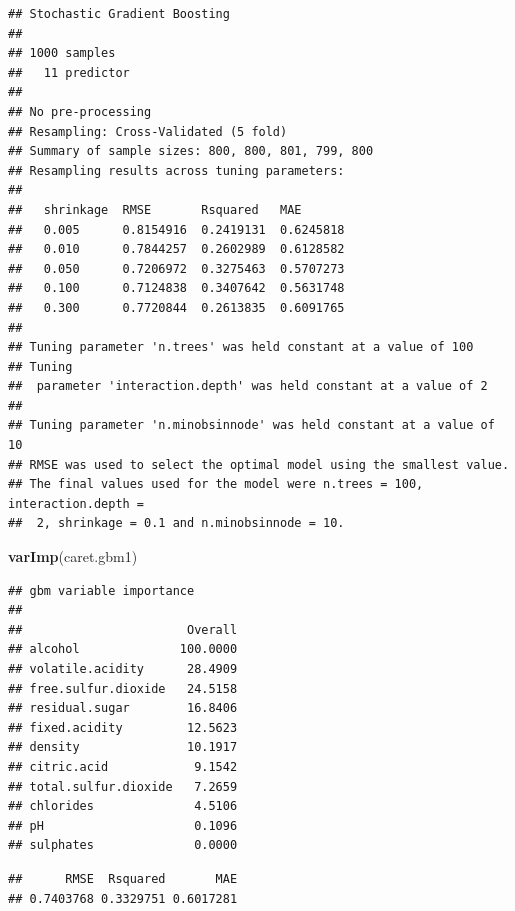 \documentclass[
  spanish,
]{book}
\newenvironment{Shaded}{\begin{snugshade}}{\end{snugshade}}
\newcommand{\DataTypeTok}[1]{\textcolor[rgb]{0.13,0.29,0.53}{#1}}
\newcommand{\KeywordTok}[1]{\textcolor[rgb]{0.13,0.29,0.53}{\textbf{#1}}}
\newcommand{\NormalTok}[1]{#1}
\newcommand{\OperatorTok}[1]{\textcolor[rgb]{0.81,0.36,0.00}{\textbf{#1}}}
\theoremstyle{break}
\theoremstyle{definition}
\theoremstyle{definition}
\theoremstyle{definition}
\theoremstyle{remark}
\begin{document}
\begin{verbatim}
## Stochastic Gradient Boosting 
## 
## 1000 samples
##   11 predictor
## 
## No pre-processing
## Resampling: Cross-Validated (5 fold) 
## Summary of sample sizes: 800, 800, 801, 799, 800 
## Resampling results across tuning parameters:
## 
##   shrinkage  RMSE       Rsquared   MAE      
##   0.005      0.8154916  0.2419131  0.6245818
##   0.010      0.7844257  0.2602989  0.6128582
##   0.050      0.7206972  0.3275463  0.5707273
##   0.100      0.7124838  0.3407642  0.5631748
##   0.300      0.7720844  0.2613835  0.6091765
## 
## Tuning parameter 'n.trees' was held constant at a value of 100
## Tuning
##  parameter 'interaction.depth' was held constant at a value of 2
## 
## Tuning parameter 'n.minobsinnode' was held constant at a value of 10
## RMSE was used to select the optimal model using the smallest value.
## The final values used for the model were n.trees = 100, interaction.depth =
##  2, shrinkage = 0.1 and n.minobsinnode = 10.
\end{verbatim}

\begin{Shaded}
\begin{Highlighting}[]
\KeywordTok{varImp}\NormalTok{(caret.gbm1)}
\end{Highlighting}
\end{Shaded}

\begin{verbatim}
## gbm variable importance
## 
##                       Overall
## alcohol              100.0000
## volatile.acidity      28.4909
## free.sulfur.dioxide   24.5158
## residual.sugar        16.8406
## fixed.acidity         12.5623
## density               10.1917
## citric.acid            9.1542
## total.sulfur.dioxide   7.2659
## chlorides              4.5106
## pH                     0.1096
## sulphates              0.0000
\end{verbatim}

\begin{Shaded}
\end{Shaded}

\begin{verbatim}
##      RMSE  Rsquared       MAE 
## 0.7403768 0.3329751 0.6017281
\end{verbatim}
\end{document}
